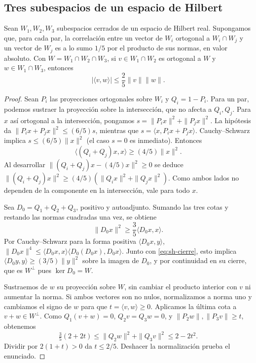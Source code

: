 \subsection{Tres subespacios de un espacio de Hilbert}

\begin{proposicion}
\label{prop:sh-angulos}
Sean $W_1,W_2,W_3$ subespacios cerrados de un espacio de Hilbert real. Supongamos que, para cada par, la correlación entre un vector de $W_i$ ortogonal a $W_i\cap W_j$ y un vector de $W_j$ es a lo sumo $1/5$ por el producto de sus normas, en valor absoluto. Con $W=W_1\cap W_2\cap W_3$, si $v\in W_1\cap W_2$ es ortogonal a $W$ y $w\in W_1\cap W_3$, entonces
\begin{equation}
 |\langle v,w\rangle|\le\frac25\|v\|\|w\|.
 \label{eq:sh-angulos}
\end{equation}
\end{proposicion}
\begin{proof}
Sean $P_i$ las proyecciones ortogonales sobre $W_i$ y $Q_i=1-P_i$. Para un par, podemos sustraer la proyección sobre la intersección, que no afecta a $Q_i,Q_j$. Para $x$ así ortogonal a la intersección, pongamos $s=\|P_i x\|^2+\|P_jx\|^2$. La hipótesis da $\|P_i x+P_jx\|^2\le(6/5)s$, mientras que $s=\langle x,P_i x+P_jx\rangle$. Cauchy--Schwarz implica $s\le(6/5)\|x\|^2$ (el caso $s=0$ es inmediato). Entonces
\[
 \langle(Q_i+Q_j)x,x\rangle\ge(4/5)\|x\|^2.
\]
Al desarrollar $\|(Q_i+Q_j)x-(4/5)x\|^2\ge0$ se deduce $\|(Q_i+Q_j)x\|^2\ge(4/5)(\|Q_i x\|^2+\|Q_jx\|^2)$. Como ambos lados no dependen de la componente en la intersección, vale para todo $x$.

Sea $D_0=Q_1+Q_2+Q_3$, positivo y autoadjunto. Sumando las tres cotas y restando las normas cuadradas una vez, se obtiene
\begin{equation}
 \|D_0x\|^2\ge\frac35\langle D_0x,x\rangle.
 \label{eq:sh-cierre}
\end{equation}
Por Cauchy--Schwarz para la forma positiva $\langle D_0x,y\rangle$,
$\|D_0x\|^4\le\langle D_0x,x\rangle\langle D_0(D_0x),D_0x\rangle$. Junto con \eqref{eq:sh-cierre}, esto implica $\langle D_0y,y\rangle\ge(3/5)\|y\|^2$ sobre la imagen de $D_0$, y por continuidad en su cierre, que es $W^\perp$ pues $\ker D_0=W$.

Sustraemos de $w$ su proyección sobre $W$, sin cambiar el producto interior con $v$ ni aumentar la norma. Si ambos vectores son no nulos, normalizamos a norma uno y cambiamos el signo de $w$ para que $t=\langle v,w\rangle\ge0$. Aplicamos la última cota a $v+w\in W^\perp$. Como $Q_1(v+w)=0$, $Q_2v=Q_3w=0$, y $\|P_2w\|,\|P_3v\|\ge t$, obtenemos
\[
 \tfrac35(2+2t)\le\|Q_2w\|^2+\|Q_3v\|^2\le 2-2t^2.
\]
Dividir por $2(1+t)>0$ da $t\le2/5$. Deshacer la normalización prueba el enunciado.
\end{proof}

